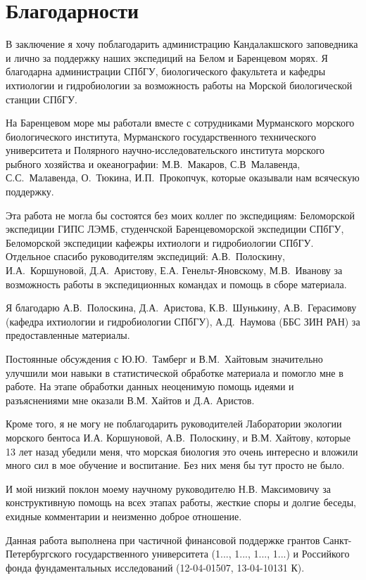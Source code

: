 \chapter*{Благодарности}
В заключение я хочу поблагодарить администрацию Кандалакшского заповедника и лично  за поддержку наших экспедиций на Белом и Баренцевом морях.
Я благодарна администрации СПбГУ, биологического факультета и кафедры ихтиологии и гидробиологии за возможность работы на Морской биологической станции СПбГУ.

На Баренцевом море мы работали вместе с сотрудниками Мурманского морского биологического института, Мурманского государственного технического университета и Полярного научно-исследовательского института морского рыбного хозяйства и океанографии: М.В.~Макаров, С.В~Малавенда, С.\:С.~Малавенда, О.~Тюкина, И.\:П.~Прокопчук, которые оказывали нам всяческую поддержку.  

Эта работа не могла бы состоятся без моих коллег по экспедициям: Беломорской экспедиции ГИПС ЛЭМБ, студенчской Баренцевоморской экспедиции СПбГУ, Беломорской экспедиции кафежры ихтиологи и гидробиологии СПбГУ. 
Отдельное спасибо руководителям экспедиций: А.\:В.~Полоскину, И.\:А.~Коршуновой, Д.\:А.~Аристову, Е.\:А. Генельт-Яновскому, М.В.~Иванову за возможность работы в экспедиционных командах и помощь в сборе материала.

Я благодарю А.\:В.~Полоскина, Д.\:А.~Аристова, К.\:В.~Шунькину, А.\:В.~Герасимову (кафедра ихтиологии и гидробиологии СПбГУ), А.\:Д.~Наумова (ББС ЗИН РАН) за предоставленные материалы.

Постоянные обсуждения с Ю.\:Ю.~Тамберг и В.\:М.~Хайтовым значительно улучшили мои навыки в статистической обработке материала и помогло мне в работе.
На этапе обработки данных неоценимую помощь идеями и разъяснениями мне оказали В.\:М. Хайтов и Д.\:А. Аристов.


Кроме того, я не могу не поблагодарить руководителей Лаборатории экологии морского бентоса И.\:А. Коршуновой, А.\:В.~Полоскину,  и В.\:М. Хайтову, которые 13 лет назад убедили меня, что морская биология это очень интересно и вложили много сил в мое обучение и воспитание. 
Без них меня бы тут просто не было.

И мой низкий поклон моему научному руководителю Н.\:В. Максимовичу за конструктивную помощь на всех этапах работы, жесткие споры и долгие беседы, ехидные комментарии и  неизменно доброе отношение.

\vspace{3ex}

Данная работа выполнена при частичной финансовой поддержке грантов Санкт-Петер\-бург\-ского государственного университета (1..., 1..., 1..., 1...) и Российкого фонда фундаментальных исследований (12-04-01507, 13-04-10131 К). 

